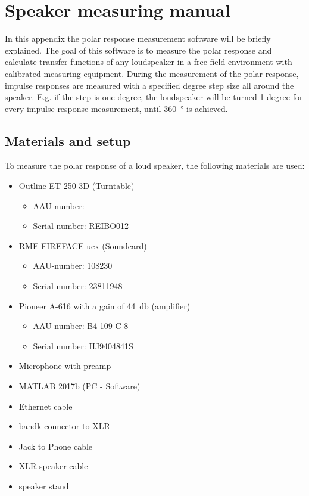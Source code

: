 \chapter{Speaker measuring manual} \label{appendix:measuring_manual}
In this appendix the polar response measurement software will be briefly explained. The goal of this software is to measure the polar response and calculate transfer functions of any loudspeaker in a free field environment with calibrated measuring equipment. During the measurement of the polar response, impulse responses are measured with a specified degree step size all around the speaker. E.g. if the step is one degree, the loudspeaker will be turned 1 degree for every  impulse response measurement, until \SI{360}{\degree} is achieved.

\section*{Materials and setup}
To measure the polar response of a loud speaker, the following materials are used:
\begin{itemize}
\item Outline ET 250-3D (Turntable)
\begin{itemize}[noitemsep]
\item AAU-number: -
\item Serial number: REIBO012
\end{itemize}
\item RME FIREFACE ucx (Soundcard)
\begin{itemize}[noitemsep]
\item AAU-number: 108230
\item Serial number: 23811948
\end{itemize}
\item Pioneer A-616 with a gain of \SI{44}{\decibel} (amplifier)
\begin{itemize}[noitemsep]
\item AAU-number: B4-109-C-8
\item Serial number: HJ9404841S
\end{itemize}
\item Microphone with preamp
\item MATLAB 2017b (PC - Software)
\item Ethernet cable 
\item \gls{bandk} connector to XLR
\item Jack to Phone cable
\item XLR speaker cable
\item speaker stand
\end{itemize}

